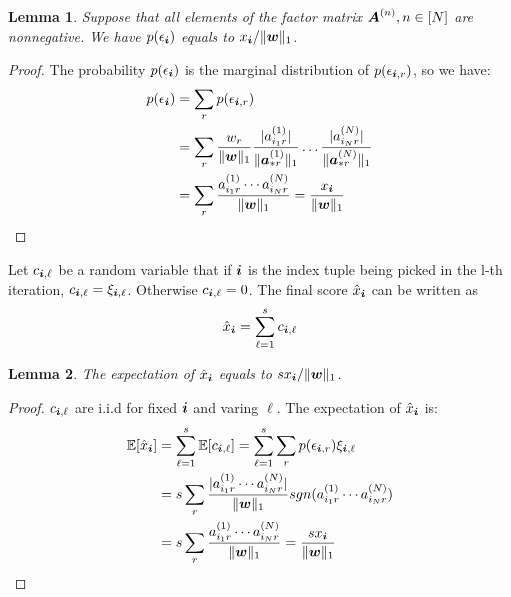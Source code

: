 \documentclass[letterpaper]{article}
\newcommand{\Sca}[3]{{#1}^{(#2)}_{i_#2#3}}%
\newcommand{\anr}[2]{\Sca{a}{#1}{#2}}
\newcommand{\score}[1]{\xi_{\V{i},#1}}
\newcommand{\V}[1]{{\boldsymbol{{\MakeLowercase{#1}}}}}
\newcommand{\ColVec}[3]{\V{#1}^{(#2)}_{#3}}
\newcommand{\NormColA}[2]{\norm{\ColVec{a}{#1}{*#2}}{1}}
\newcommand{\predx}{\hat{x}_{\V{i}}}
\newcommand{\M}[1]{{\boldsymbol{{\MakeUppercase{#1}}}}}
\newcommand{\norm}[2]{\|#1\|_{#2}}
\newtheorem{lemma}{Lemma}
\begin{document}
\begin{lemma}\label{lem:Probability}
    Suppose that all elements of the factor matrix $\M{A}^{(n)}, n\in[N]$ are nonnegative. We have
    $p(\epsilon_{\V{i}})$ equals to $x_{\V{i}}/\norm{\V{w}}{1}$.
\end{lemma}
\begin{proof}
The probability $p(\epsilon_{\V{i}})$ is the marginal distribution of $p(\epsilon_{\V{i},r})$,
so we have:
\begin{align*}
p(\epsilon_{\V{i}})
& = \sum_{r} p(\epsilon_{\V{i},r}) \\
& = \sum_{r} \frac{w_{r}}{\norm{\V{W}}{1}}
    \frac{|\anr{1}{r}|}{\NormColA{1}{r}} \ldots \frac{|\anr{N}{r}|}{\NormColA{N}{r}}\\
& = \sum_{r} \frac{\anr{1}{r}\cdots\anr{N}{r}}{\norm{\V{W}}{1}}
  = \frac{x_{\V{i}}}{\norm{\V{w}}{1}}
\end{align*}
\end{proof}
Let $c_{\V{i},\ell}$ be a random variable that if $\V{i}$ is the index tuple 
being picked in the l-th iteration, $c_{\V{i},\ell}=\score{\ell}$. 
Otherwise $c_{\V{i},\ell}=0$. 
The final score $\predx$ can be written as
\begin{equation}\label{eq:score}
\predx = \sum_{\ell=1}^{s} c_{\V{i},\ell}
\end{equation}

\begin{lemma}\label{lem:Expectation}
The expectation of $\predx$ equals to $sx_{\V{i}}/\norm{\V{w}}{1}$.
\end{lemma}
\begin{proof}
    $c_{\V{i},\ell}$ are i.i.d for fixed $\V{i}$ and varing $\ell$. 
    The expectation of $\predx$ is:
\begin{align*}
\mathbb{E}[\predx]
& = \sum_{\ell=1}^{s}\mathbb{E}[c_{\V{i},\ell}] = \sum_{\ell=1}^{s}\sum_{r} p(\epsilon_{\V{i},r})\score{\ell} \\
& = s\sum_{r} \frac{|\anr{1}{r}\cdots\anr{N}{r}|}{\norm{\V{W}}{1}}
                  sgn(\anr{1}{r}\cdots\anr{N}{r})\\
& = s\sum_{r} \frac{\anr{1}{r}\cdots\anr{N}{r}}{\norm{\V{W}}{1}}
  = \frac{sx_{\V{i}}}{\norm{\V{w}}{1}}
\end{align*}
\end{proof}
\end{document}
